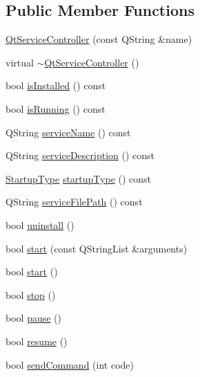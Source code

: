 \subsection*{Public Member Functions}
\begin{DoxyCompactItemize}
\item 
\hyperlink{class_qt_service_controller_ab5c5bb7d168d2e59f0784ded380d7adf}{Qt\+Service\+Controller} (const Q\+String \&name)
\item 
virtual \hyperlink{class_qt_service_controller_a3288eead2b9862c3a70e7decbaebc908}{$\sim$\+Qt\+Service\+Controller} ()
\item 
bool \hyperlink{class_qt_service_controller_a7e36fb18a273118709faf22f732feac4}{is\+Installed} () const
\item 
bool \hyperlink{class_qt_service_controller_a4a11b35468848388174a36af66f25fc3}{is\+Running} () const
\item 
Q\+String \hyperlink{class_qt_service_controller_a3df972ecd01a00fff5cda316ae35cbea}{service\+Name} () const
\item 
Q\+String \hyperlink{class_qt_service_controller_a503c0fadf098b4c5bbccbb2a57f911e2}{service\+Description} () const
\item 
\hyperlink{class_qt_service_controller_a946ac2b079d9760503da923c2eaf0aac}{Startup\+Type} \hyperlink{class_qt_service_controller_acfd3b5cb23c17bf415f1d606b8461109}{startup\+Type} () const
\item 
Q\+String \hyperlink{class_qt_service_controller_a5ab709fdeb3ab526c92ccbbe1b2706c6}{service\+File\+Path} () const
\item 
bool \hyperlink{class_qt_service_controller_a25cd2f1f6868ece5de77976eb55cb74c}{uninstall} ()
\item 
bool \hyperlink{class_qt_service_controller_a70f274d3f4f5a5fea60b8fd7331b31fb}{start} (const Q\+String\+List \&arguments)
\item 
bool \hyperlink{class_qt_service_controller_a5e9d6da5081d70f31611456d0ef0687e}{start} ()
\item 
bool \hyperlink{class_qt_service_controller_ad06afa647666769e309474b18bf7cf90}{stop} ()
\item 
bool \hyperlink{class_qt_service_controller_aeee2fcc9469f77c7ed8a7955c4fa3a07}{pause} ()
\item 
bool \hyperlink{class_qt_service_controller_a2d71eab6146427fc7b431386bf72eaec}{resume} ()
\item 
bool \hyperlink{class_qt_service_controller_a1428c7d51403416bc7663ae37c446cfc}{send\+Command} (int code)
\end{DoxyCompactItemize}
